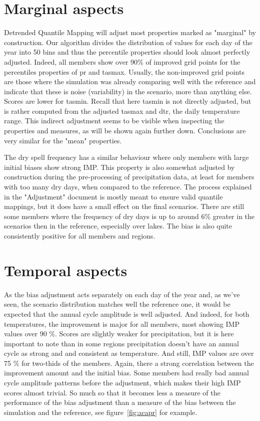 \documentclass[letterpaper,10pt]{article}
\begin{document}
\section{Marginal aspects}
Detrended Quantile Mapping will adjust most properties marked as "marginal" by construction. Our algorithm divides the distribution of values for each day of the year into 50 bins and thus the percentile properties should look almost perfectly adjusted. Indeed, all members show over 90\% of improved grid points for the percentiles properties of pr and tasmax. Usually, the non-improved grid points are those where the simulation was already comparing well with the reference and indicate that these is noise (variability) in the scenario, more than anything else. Scores are lower for tasmin. Recall that here tasmin is not directly adjusted, but is rather computed from the adjusted tasmax and dtr, the daily temperature range. This indirect adjustment seems to be visible when inspecting the properties and measures, as will be shown again further down. Conclusions are very similar for the "mean" properties.

The dry spell frequency has a similar behaviour where only members with large initial biases show strong IMP. This property is also somewhat adjusted by construction during the pre-processing of precipitation data, at least for members with too many dry days, when compared to the reference. The process explained in the "Adjustment" document is mostly meant to ensure valid quantile mappings, but it does have a small effect on the final scenarios. There are still some members where the frequency of dry days is up to around 6\% greater in the scenarios then in the reference, especially over lakes. The bias is also quite consistently positive for all members and regions.

\section{Temporal aspects}
As the bias adjustment acts separately on each day of the year and, as we've seen, the scenario distribution matches well the reference one, it would be expected that the annual cycle amplitude is well adjusted. And indeed, for both temperatures, the improvement is major for all members, most showing IMP values over 90 \%. Scores are slightly weaker for precipitation, but it is here important to note than in some regions precipitation doesn't have an annual cycle as strong and and consistent as temperature. And still, IMP values are over 75 \% for two-thids of the members. Again, there a strong correlation between the improvement amount and the initial bias. Some members had really bad annual cycle amplitude patterns before the adjustment, which makes their high IMP scores almost trivial. So much so that it becomes less a measure of the performance of the bias adjustment than a measure of the bias between the simulation and the reference, see figure~\ref{fig:acapr} for example.
\end{document}
